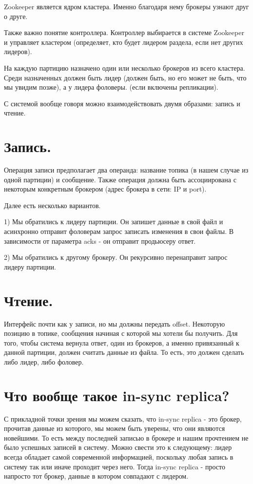 \documentclass[11pt]{article}
\begin{document}
    Zookeeper является ядром кластера. Именно благодаря нему брокеры узнают друг о друге.

    Также важно понятие контроллера. Контроллер выбирается в системе Zookeeper и управляет кластером (определяет, кто будет лидером раздела, если нет других лидеров).

    На каждую партицию назначено один или несколько брокеров из всего кластера. Среди назначенных должен быть лидер (должен быть, но его может не быть, что мы увидим позже), а у лидера фоловеры. (если включены репликации).

    С системой вообще говоря можно взаимодействовать двумя образами: запись и чтение.
    \section*{Запись.}
    Операция записи предполагает два операнда: название топика (в нашем случае из одной партиции) и сообщение. Также операция должна быть ассоциирована с некоторым конкретным брокером (адрес брокера в сети: IP и port).

    Далее есть несколько вариантов.

    1) Мы обратились к лидеру партиции. Он запишет данные в свой файл и асинхронно отправит фоловерам запрос записать изменения в свои файлы. В зависимости от параметра acks - он отправит продьюсеру ответ.

    2) Мы обратились к другому брокеру. Он рекурсивно перенаправит запрос лидеру партиции.
    \section*{Чтение.}
    Интерфейс почти как у записи, но мы должны передать offset. Некоторую позицию в топике, сообщения начиная с которой мы хотели бы получить. Для того, чтобы система вернула ответ, один из брокеров, а именно привязанный к данной партиции, должен считать данные из файла. То есть, это должен сделать либо лидер, либо фоловер.
    \section{Что вообще такое in-sync replica?}
    С прикладной точки зрения мы можем сказать, что in-sync replica - это брокер, прочитав данные из которого, мы можем быть уверены, что они являются новейшими. То есть между последней записью в брокере и нашим прочтением не было успешных записей в систему. Можно свести это к следующему: лидер всегда обладает самой современной информацией, поскольку любая запись в систему так или иначе проходит через него. Тогда in-sync replica - просто напросто тот брокер, данные в котором совпадают с лидером.
\end{document}
